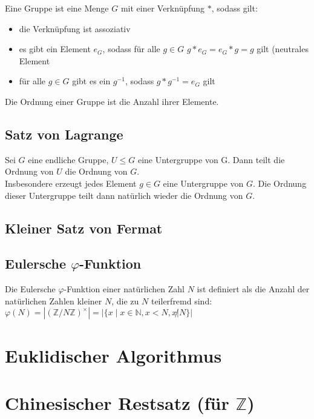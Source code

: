 \documentclass[a4paper,twoside,DIV15,BCOR12mm]{scrbook}
\begin{document}
Eine Gruppe ist eine Menge $G$ mit einer Verknüpfung $*$, sodass gilt:

\begin{itemize}
	\item die Verknüpfung ist assoziativ
	\item es gibt ein Element $e_G$, sodass für alle $g \in G$ $g * e_G = e_G * g =g$ gilt (neutrales Element
	\item für alle $g \in G$ gibt es ein $g^{-1}$, sodass $g * g^{-1} = e_G$ gilt
\end{itemize}

Die Ordnung einer Gruppe ist die Anzahl ihrer Elemente.

\subsection{Satz von Lagrange}

Sei $G$ eine endliche Gruppe, $U \leq G$ eine Untergruppe von G. Dann teilt die Ordnung von $U$ die Ordnung von $G$.\\

Insbesondere erzeugt jedes Element $g \in G$ eine Untergruppe von $G$. Die Ordnung dieser Untergruppe teilt dann natürlich wieder die Ordnung von $G$.

\subsection{Kleiner Satz von Fermat}

\subsection{Eulersche $\varphi$-Funktion}

Die Eulersche $\varphi$-Funktion einer natürlichen Zahl $N$ ist definiert als die Anzahl der natürlichen Zahlen kleiner $N$, die zu $N$ teilerfremd sind: $\varphi(N) = \left|(\mathbb{Z}/N\mathbb{Z})^\times \right| = \left| \{ x \mid x \in \mathbb{N}, x < N, x \not| N \} \right|$

\section{Euklidischer Algorithmus}

\section{Chinesischer Restsatz (für $\mathbb{Z}$)}



%
\end{document}

